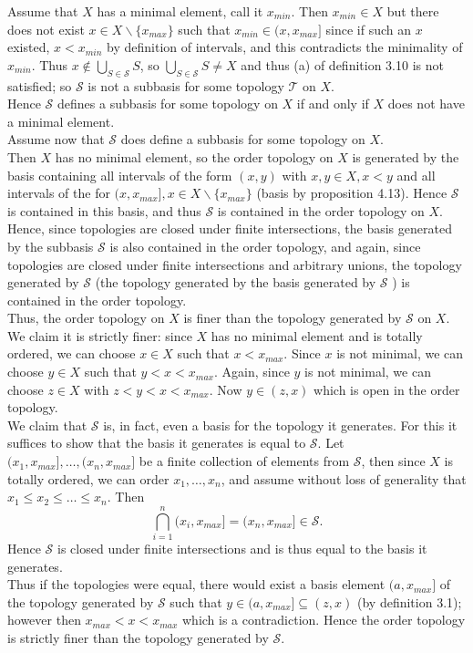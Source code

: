 \documentclass[a4paper]{article}
\begin{document}
Assume that $X$ has a minimal element, call it $x_{min}$. Then $x_{min} \in X$
but there does not exist $x \in X \backslash \{x_{max}\}$ such that
$x_{min} \in (x, x_{max}]$ since if such an $x$ existed, $x < x_{min}$ by
definition of intervals, and this contradicts the minimality of $x_{min}$. Thus
$x \not\in \bigcup_{S \in \mathcal{S}} S$, so $\bigcup_{S \in \mathcal{S}}
S \neq X$ and thus (a) of definition 3.10 is not satisfied; so $\mathcal{S}$ is
not a subbasis for some topology $\mathcal{T}$ on $X$.\\
Hence $\mathcal{S}$ defines a subbasis for some topology on $X$ if and only if
$X$ does not have a minimal element.\\
\linebreak
Assume now that $\mathcal{S}$ does define a subbasis for some topology on
$X$.\\
Then $X$ has no minimal element, so the order topology on $X$ is generated by
the basis containing all intervals of the form $(x,y)$ with $x,y \in X, x<y$
and all intervals of the for $(x, x_{max}], x \in X \backslash \{x_{max}\}$
(basis by proposition 4.13). Hence $\mathcal{S}$ is contained in this basis,
and thus $\mathcal{S}$ is contained in the order topology on $X$. Hence, since
topologies are closed under finite intersections, the basis generated by the
subbasis $\mathcal{S}$ is also contained in the order topology, and again,
since topologies are closed under finite intersections and arbitrary unions,
the topology generated by $\mathcal{S}$ (the topology generated by the basis
generated by $\mathcal{S}$ ) is contained in the order topology.\\
\linebreak
Thus, the order topology on $X$ is finer than the topology generated by
$\mathcal{S}$ on $X$. We claim it is strictly finer:
since $X$ has no minimal element and is totally
ordered, we can choose $x \in X$ such that $x < x_{max}$. Since $x$ is not
minimal, we can choose $y \in X$ such that $y < x < x_{max}$. Again, since $y$
is not minimal, we can choose $z \in X$ with $z < y < x < x_{max}$. Now
$y \in (z,x)$ which is open in the order topology.\\
\linebreak
We claim that $\mathcal{S}$
is, in fact, even a basis for the topology it generates. For this it suffices
to show that the basis it generates is equal to $\mathcal{S}$.
Let $(x_1, x_{max}], \ldots, (x_n, x_{max}]$ be a finite collection of elements
from $\mathcal{S}$, then since $X$ is totally ordered, we can order $x_1,
\ldots, x_n$, and assume without loss of generality that
$x_1 \le x_2 \le \ldots \le x_n$. Then
\[
    \bigcap_{i=1}^{n} (x_i, x_{max}] = (x_n, x_{max}] \in \mathcal{S}
.\] 
Hence $\mathcal{S}$ is closed under finite intersections and is thus equal to
the basis it generates.\\
Thus if the topologies were equal, there would exist a basis element $(a,
x_{max}]$ of the topology generated by $\mathcal{S}$ such that
$y \in (a, x_{max}] \subseteq (z,x)$ (by definition 3.1);
however then $x_{max} < x < x_{max}$
which is a contradiction. Hence the order topology is strictly finer than the
topology generated by $\mathcal{S}$.
\end{document}
